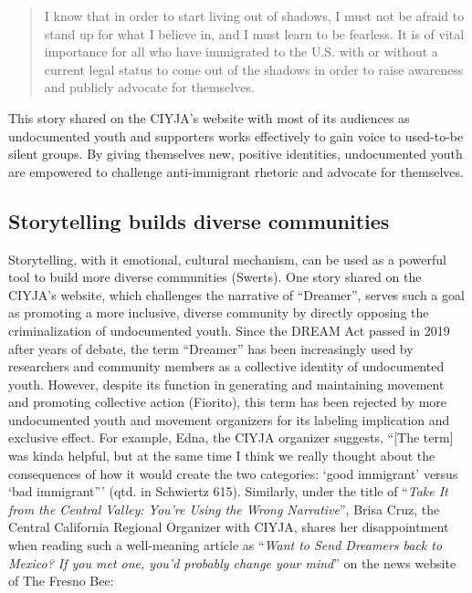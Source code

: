 \documentclass[12pt]{article}
\begin{document}
\begin{flushleft}
\begin{quotation}
    \noindent
    I know that in order to start living out of shadows, I must not be afraid to stand up for what I believe in, and I must learn to be fearless.
    It is of vital importance for all who have immigrated to the U.S. with or without a current legal status to come out of the shadows in order to raise awareness and publicly advocate for themselves.
\end{quotation} %

This story shared on the CIYJA's website with most of its audiences as undocumented youth and supporters works effectively to gain voice to used-to-be silent groups. 
By giving themselves new, positive identities, undocumented youth are empowered to challenge anti-immigrant rhetoric and advocate for themselves.

\subsection*{Storytelling builds diverse communities}

Storytelling, with it emotional, cultural mechanism, can be used as a powerful tool to build more diverse communities (Swerts). %
One story shared on the CIYJA's website, which challenges the narrative of ``Dreamer'', serves such a goal as promoting a more inclusive, diverse community by directly opposing the criminalization of undocumented youth. %
Since the DREAM Act passed in 2019 after years of debate, the term ``Dreamer'' has been increasingly used by researchers and community members as a collective identity of undocumented youth. 
However, despite its function in generating and maintaining movement and promoting collective action (Fiorito), this term has been rejected by more undocumented youth and movement organizers for its labeling implication and exclusive effect. 
For example, Edna, the CIYJA organizer suggests, ``[The term] was kinda helpful, but at the same time I think we really thought about the consequences of how it would create the two categories: ‘good immigrant' versus ‘bad immigrant''' (qtd. in  Schwiertz 615). %
Similarly, under the title of ``\textit{Take It from the Central Valley: You're Using the Wrong Narrative}'', Brisa Cruz, the Central California Regional Organizer with CIYJA, shares her disappointment when reading such a well-meaning article as ``\textit{Want to Send Dreamers back to Mexico? If you met one, you'd probably change your mind}'' on the news website of The Fresno Bee:


\end{flushleft}
\end{document}
